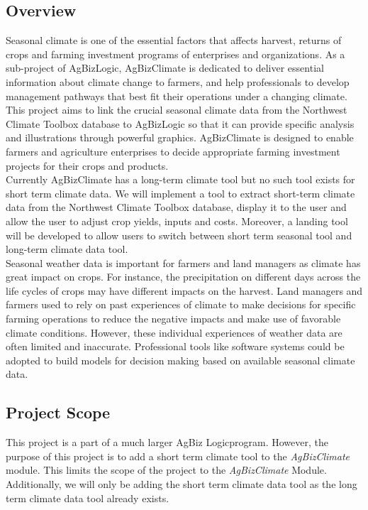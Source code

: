 \documentclass[onecolumn, draftclsnofoot,10pt, compsoc]{article}
\begin{document}
		\nocite{*}
    
    


		\subsection{Overview}
			Seasonal climate is one of the essential factors that affects harvest, returns of crops and farming investment programs of enterprises and organizations. As a sub-project of AgBizLogic, AgBizClimate is dedicated to deliver essential information about climate change to farmers, and help professionals to develop management pathways that best fit their operations under a changing climate. This project aims to link the crucial seasonal climate data from the Northwest Climate Toolbox database to AgBizLogic so that it can provide specific analysis and illustrations through powerful graphics. AgBizClimate is designed to enable farmers and agriculture enterprises to decide appropriate farming investment projects for their crops and products.\\

            Currently AgBizClimate has a long-term climate tool but no such tool exists for short term climate data. We will implement a tool to extract short-term climate data from the Northwest Climate Toolbox database, display it to the user and allow the user to adjust crop yields, inputs and costs. Moreover, a landing tool will be developed to allow users to switch between short term seasonal tool and long-term climate data tool.\\

            Seasonal weather data is important for farmers and land managers as climate has great impact on crops. For instance, the precipitation on different days across the life cycles of crops may have different impacts on the harvest. Land managers and farmers used to rely on past experiences of climate to make decisions for specific farming operations to reduce the negative impacts and make use of favorable climate conditions. However, these individual experiences of weather data are often limited and inaccurate. Professional tools like software systems could be adopted to build models for decision making based on available seasonal climate data.\\

    \subsection{Project Scope}
		This project is a part of a much larger AgBiz Logic\texttrademark program. However, the purpose of this project is to add a short term climate tool to the \textit{AgBizClimate} module. This limits the scope of the project to the \textit{AgBizClimate} Module. Additionally, we will only be adding the short term climate data tool as the long term climate data tool already exists.\\
\end{document}
